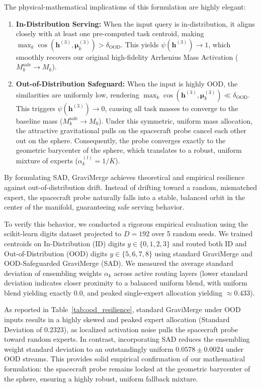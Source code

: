 The physical-mathematical implications of this formulation are highly elegant:
\begin{enumerate}
    \item \textbf{In-Distribution Serving:} When the input query is in-distribution, it aligns closely with at least one pre-computed task centroid, making $\max_k \cos(\mathbf{h}^{(3)}, \boldsymbol{\mu}_k^{(3)}) > \delta_{\text{OOD}}$. This yields $\psi(\mathbf{h}^{(3)}) \to 1$, which smoothly recovers our original high-fidelity Arrhenius Mass Activation ($M_k^{\text{safe}} \to M_k$).
    \item \textbf{Out-of-Distribution Safeguard:} When the input is highly OOD, the similarities are uniformly low, rendering $\max_k \cos(\mathbf{h}^{(3)}, \boldsymbol{\mu}_k^{(3)}) \ll \delta_{\text{OOD}}$. This triggers $\psi(\mathbf{h}^{(3)}) \to 0$, causing all task masses to converge to the baseline mass ($M_k^{\text{safe}} \to M_0$). Under this symmetric, uniform mass allocation, the attractive gravitational pulls on the spacecraft probe cancel each other out on the sphere. Consequently, the probe converges exactly to the geometric barycenter of the sphere, which translates to a robust, uniform mixture of experts ($\alpha_k^{(l)} = 1/K$).
\end{enumerate}
By formulating SAD, GraviMerge achieves theoretical and empirical resilience against out-of-distribution drift. Instead of drifting toward a random, mismatched expert, the spacecraft probe naturally falls into a stable, balanced orbit in the center of the manifold, guaranteeing safe serving behavior.

To verify this behavior, we conducted a rigorous empirical evaluation using the scikit-learn digits dataset projected to $D=192$ over 5 random seeds. We trained centroids on In-Distribution (ID) digits $y \in \{0, 1, 2, 3\}$ and routed both ID and Out-of-Distribution (OOD) digits $y \in \{5, 6, 7, 8\}$ using standard GraviMerge and OOD-Safeguarded GraviMerge (SAD). We measured the average standard deviation of ensembling weights $\alpha_k$ across active routing layers (lower standard deviation indicates closer proximity to a balanced uniform blend, with uniform blend yielding exactly $0.0$, and peaked single-expert allocation yielding $\approx 0.433$).

As reported in Table~\ref{tab:ood_resilience}, standard GraviMerge under OOD inputs results in a highly skewed and peaked expert allocation (Standard Deviation of $0.2323$), as localized activation noise pulls the spacecraft probe toward random experts. In contrast, incorporating SAD reduces the ensembling weight standard deviation to an outstandingly uniform \textbf{$0.0578 \pm 0.0024$} under OOD streams. This provides solid empirical confirmation of our mathematical formulation: the spacecraft probe remains locked at the geometric barycenter of the sphere, ensuring a highly robust, uniform fallback mixture.

